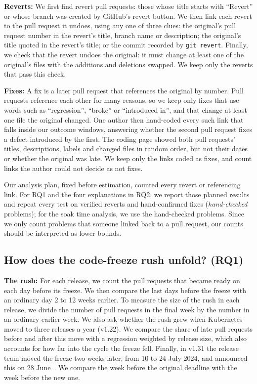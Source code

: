 \documentclass[10pt,conference]{IEEEtran}
\begin{document}
\textbf{Reverts:} We first find revert pull requests: those whose title starts with ``Revert'' or whose branch was created by GitHub's revert button. We then link each revert to the pull request it undoes, using any one of three clues: the original's pull request number in the revert's title, branch name or description; the original's title quoted in the revert's title; or the commit recorded by \texttt{git revert}. Finally, we check that the revert undoes the original: it must change at least one of the original's files with the additions and deletions swapped. We keep only the reverts that pass this check.

\textbf{Fixes:} A fix is a later pull request that references the original by number. Pull requests reference each other for many reasons, so we keep only fixes that use words such as ``regression'', ``broke'' or ``introduced in'', and that change at least one file the original changed. One author then hand-coded every such link that falls inside our outcome windows, answering whether the second pull request fixes a defect introduced by the first. The coding page showed both pull requests' titles, descriptions, labels and changed files in random order, but not their dates or whether the original was late. We keep only the links coded as fixes, and count links the author could not decide as not fixes.

Our analysis plan, fixed before estimation, counted every revert or referencing link. For RQ1 and the four explanations in RQ2, we report those planned results and repeat every test on verified reverts and hand-confirmed fixes (\emph{hand-checked} problems); for the soak time analysis, we use the hand-checked problems. Since we only count problems that someone linked back to a pull request, our counts should be interpreted as lower bounds.

\subsection{How does the code-freeze rush unfold? (RQ1)}
\textbf{The rush:} For each release, we count the pull requests that became ready on each day before its freeze. We then compare the last days before the freeze with an ordinary day 2 to 12 weeks earlier. To measure the size of the rush in each release, we divide the number of pull requests in the final week by the number in an ordinary earlier week. We also ask whether the rush grew when Kubernetes moved to three releases a year (v1.22). We compare the share of late pull requests before and after this move with a regression weighted by release size, which also accounts for how far into the cycle the freeze fell. Finally, in v1.31 the release team moved the freeze two weeks later, from 10 to 24 July 2024, and announced this on 28 June~\cite{k8s131freeze}. We compare the week before the original deadline with the week before the new one.
\end{document}
